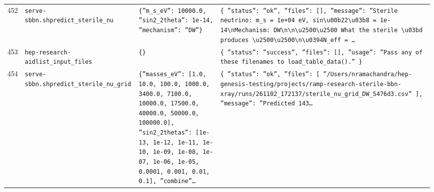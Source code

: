 \documentclass[11pt,a4paper]{article}
\begin{document}
\begin{longtable}{@{}p{}p{}p{}p{}@{}}
452 & \texttt{serve-sbbn.sh}\newline\texttt{predict\_\allowbreak{}sterile\_\allowbreak{}nu} & \texttt{\{''m\_\allowbreak{}s\_\allowbreak{}eV'':\allowbreak{} 10000.0,\allowbreak{} ''sin2\_\allowbreak{}2theta'':\allowbreak{} 1e-14,\allowbreak{} ''mechanism'':\allowbreak{} ''DW''\}\allowbreak{}} & \texttt{\{   ''status'':\allowbreak{} ''ok'',\allowbreak{}   ''files'':\allowbreak{} []\allowbreak{},\allowbreak{}   ''message'':\allowbreak{} ''Sterile neutrino:\allowbreak{} m\_\allowbreak{}s =\allowbreak{} 1e+04 eV,\allowbreak{} sin\textbackslash{}\allowbreak{}u00b22\textbackslash{}\allowbreak{}u03b8 =\allowbreak{} 1e-14\textbackslash{}\allowbreak{}nMechanism:\allowbreak{} DW\textbackslash{}\allowbreak{}n\textbackslash{}\allowbreak{}n\textbackslash{}\allowbreak{}u2500\textbackslash{}\allowbreak{}u2500 What the sterile \textbackslash{}\allowbreak{}u03bd produces \textbackslash{}\allowbreak{}u2500\textbackslash{}\allowbreak{}u2500\textbackslash{}\allowbreak{}n\textbackslash{}\allowbreak{}u0394N\_\allowbreak{}eff =\allowbreak{} \ldots{}\allowbreak{}} \\
453 & \texttt{hep-research-aid}\newline\texttt{list\_\allowbreak{}input\_\allowbreak{}files} & \texttt{\{\}\allowbreak{}} & \texttt{\{   ''status'':\allowbreak{} ''success'',\allowbreak{}   ''files'':\allowbreak{} []\allowbreak{},\allowbreak{}   ''usage'':\allowbreak{} ''Pass any of these filenames to load\_\allowbreak{}table\_\allowbreak{}data()\allowbreak{}.'' \}\allowbreak{}} \\
454 & \texttt{serve-sbbn.sh}\newline\texttt{predict\_\allowbreak{}sterile\_\allowbreak{}nu\_\allowbreak{}grid} & \texttt{\{''masses\_\allowbreak{}eV'':\allowbreak{} [1.0,\allowbreak{} 10.0,\allowbreak{} 100.0,\allowbreak{} 1000.0,\allowbreak{} 3400.0,\allowbreak{} 7100.0,\allowbreak{} 10000.0,\allowbreak{} 17500.0,\allowbreak{} 40000.0,\allowbreak{} 50000.0,\allowbreak{} 100000.0]\allowbreak{},\allowbreak{} ''sin2\_\allowbreak{}2thetas'':\allowbreak{} [1e-13,\allowbreak{} 1e-12,\allowbreak{} 1e-11,\allowbreak{} 1e-10,\allowbreak{} 1e-09,\allowbreak{} 1e-08,\allowbreak{} 1e-07,\allowbreak{} 1e-06,\allowbreak{} 1e-05,\allowbreak{} 0.0001,\allowbreak{} 0.001,\allowbreak{} 0.01,\allowbreak{} 0.1]\allowbreak{},\allowbreak{} ''combine''\ldots{}\allowbreak{}} & \texttt{\{   ''status'':\allowbreak{} ''ok'',\allowbreak{}   ''files'':\allowbreak{} [     ''/\allowbreak{}Users/\allowbreak{}nramachandra/\allowbreak{}hep-genesis-testing/\allowbreak{}projects/\allowbreak{}ramp-research-sterile-bbn-xray/\allowbreak{}runs/\allowbreak{}261102\_\allowbreak{}172137/\allowbreak{}sterile\_\allowbreak{}nu\_\allowbreak{}grid\_\allowbreak{}DW\_\allowbreak{}5476d3.csv''   ]\allowbreak{},\allowbreak{}   ''message'':\allowbreak{} ''Predicted 143\ldots{}\allowbreak{}} \\

\end{longtable}
\end{document}
